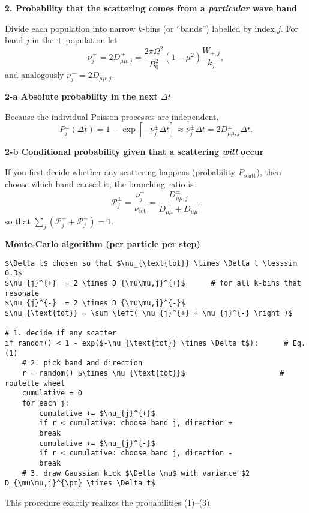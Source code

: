 \begin{tcolorbox}[colback=white, colframe=black, title={Setup}]

\textbf{2. Probability that the scattering comes from a \emph{particular} wave band}

Divide each population into narrow $k$-bins (or ``bands'') labelled by index $j$. For band $j$ in the $+$ population let
\[
\nu_{j}^{\,+} = 2 D_{\mu\mu,j}^{\,+} 
= \frac{2\pi \Omega^{2}}{B_0^{2}} (1 - \mu^{2}) \frac{W_{+,j}}{k_{j}},
\]
and analogously $\nu_{j}^{\,-} = 2 D_{\mu\mu,j}^{\,-}$.

\medskip

\textbf{2-a Absolute probability in the next $\Delta t$}

Because the individual Poisson processes are independent,
\begin{equation}
P_{j}^{\pm}(\Delta t) = 1 - \exp\left[-\nu_{j}^{\pm} \Delta t\right]
\approx \nu_{j}^{\pm} \Delta t = 2 D_{\mu\mu,j}^{\pm} \Delta t.
\tag{2}
\end{equation}

\medskip

\textbf{2-b Conditional probability given that a scattering \emph{will} occur}

If you first decide whether any scattering happens (probability $P_{\text{scatt}}$), then choose which band caused it, the branching ratio is
\begin{equation}
\boxed{
\mathcal{P}_{j}^{\pm} = 
\frac{\nu_{j}^{\pm}}{\nu_{\text{tot}}} = 
\frac{D_{\mu\mu,j}^{\pm}}{D_{\mu\mu}^{\,+} + D_{\mu\mu}^{\,-}}
}.
\tag{3}
\end{equation}
so that $\sum_{j} \left( \mathcal{P}_{j}^{+} + \mathcal{P}_{j}^{-} \right) = 1$.

\medskip

\textbf{Monte-Carlo algorithm (per particle per step)}
\begin{lstlisting}[mathescape=true, basicstyle=\ttfamily\small]
$\Delta t$ chosen so that $\nu_{\text{tot}} \times \Delta t \lesssim 0.3$
$\nu_{j}^{+}  = 2 \times D_{\mu\mu,j}^{+}$      # for all k-bins that resonate
$\nu_{j}^{-}  = 2 \times D_{\mu\mu,j}^{-}$
$\nu_{\text{tot}} = \sum \left( \nu_{j}^{+} + \nu_{j}^{-} \right )$

# 1. decide if any scatter
if random() < 1 - exp($-\nu_{\text{tot}} \times \Delta t$):      # Eq. (1)
    # 2. pick band and direction
    r = random() $\times \nu_{\text{tot}}$                      # roulette wheel
    cumulative = 0
    for each j:
        cumulative += $\nu_{j}^{+}$
        if r < cumulative: choose band j, direction +
        break
        cumulative += $\nu_{j}^{-}$
        if r < cumulative: choose band j, direction -
        break
    # 3. draw Gaussian kick $\Delta \mu$ with variance $2 D_{\mu\mu,j}^{\pm} \times \Delta t$
\end{lstlisting}

This procedure exactly realizes the probabilities (1)–(3).

\end{tcolorbox}

